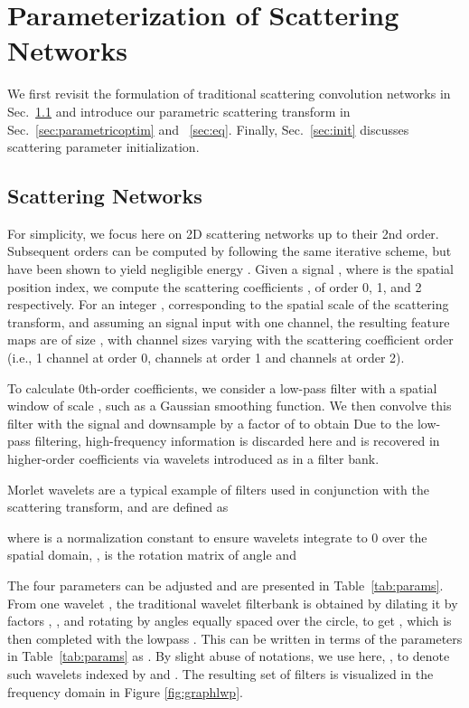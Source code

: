 \documentclass[10pt,twocolumn,letterpaper]{article}
\begin{document}
\section{Parameterization of Scattering Networks}
\label{sec:parametric_scattering_networks}
We first revisit the formulation of traditional scattering convolution networks in Sec.~\ref{sec:scatteringnetworks} and introduce our parametric scattering transform in Sec.~\ref{sec:parametricoptim} and ~\ref{sec:eq}. Finally, Sec.~\ref{sec:init} discusses scattering parameter initialization.

\subsection{Scattering Networks}
\label{sec:scatteringnetworks}

For simplicity, we focus here on 2D scattering networks up to their 2nd order. Subsequent orders can be computed by following the same iterative scheme, but have been shown to yield negligible energy \cite{bruna2013invariant}. Given a signal , where  is the spatial position index, we compute the scattering coefficients , of order 0, 1, and 2 respectively. For an integer , corresponding to the spatial scale of the scattering transform, and assuming an  signal input with one channel, the resulting feature maps are of size , with channel sizes varying with the scattering coefficient order (i.e., 1 channel at order 0,  channels at order 1 and  channels at order 2).   

To calculate 0th-order coefficients, we consider a low-pass filter  with a spatial window of scale , such as a Gaussian smoothing function. We then convolve this filter with the signal and downsample by a factor of  to obtain 
Due to the low-pass filtering, high-frequency information is discarded here and is recovered in higher-order coefficients via wavelets introduced as in a filter bank.

Morlet wavelets are a typical example of filters used in conjunction with the scattering transform, and are defined as
\vspace{-15pt}

where  is a normalization constant to ensure wavelets integrate to 0 over the spatial domain, ,  is the rotation matrix of angle  and 

The four parameters can be adjusted and are presented in Table~\ref{tab:params}. 
From one wavelet , the traditional wavelet filterbank is obtained by dilating it by factors , , and rotating by  angles  equally spaced over the circle, to get , which is then completed with the lowpass .  This can be written in terms of the parameters in Table~\ref{tab:params} as . By slight abuse of notations, we use  here, , to denote such wavelets indexed by  and . The resulting set of filters is visualized in the frequency domain in Figure \ref{fig:graphlwp}. 
\end{document}

